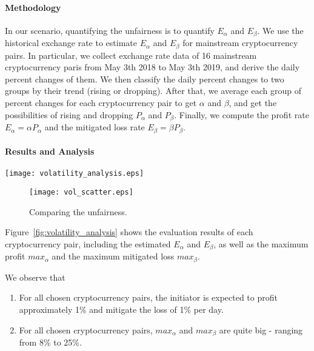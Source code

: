 \paragraph{Methodology}
In our scenario, quantifying the unfairness is to quantify $E_{\alpha}$ and $E_{\beta}$.
We use the historical exchange rate to estimate $E_{\alpha}$ and $E_{\beta}$ for mainstream cryptocurrency pairs.
In particular, we collect exchange rate data of 16 mainstream cryptocurrency paris from May 3th 2018 to May 3th 2019,
and derive the daily percent changes of them.
We then classify the daily percent changes to two groups by their trend (rising or dropping). 
After that, we average each group of percent changes for each cryptocurrency pair to get $\alpha$ and $\beta$,
and get the possibilities of rising and dropping $P_{\alpha}$ and $P_{\beta}$.
Finally, we compute the profit rate $E_{\alpha} = \alpha P_{\alpha}$ and the mitigated loss rate $E_{\beta} = \beta P_{\beta}$.

\paragraph{Results and Analysis}

\begin{figure*}
    \texttt{[image: volatility\_analysis.eps]}
    \caption{Diagram showing the unfairness.} %
    \label{fig:volatility_analysis}
\end{figure*}

\begin{figure}
    \texttt{[image: vol\_scatter.eps]}
    \caption{Comparing the unfairness.} %
    \label{fig:vol_scatter}
\end{figure}

Figure~\ref{fig:volatility_analysis} shows the evaluation results of each cryptocurrency pair, including the estimated $E_\alpha$ and $E_\beta$, as well as the maximum profit $max_\alpha$ and the maximum mitigated loss $max_\beta$.

We observe that %

\begin{enumerate}
    \item For all chosen cryptocurrency pairs, the initiator is expected to profit approximately 1\% and mitigate the loss of 1\% per day.
    \item For all chosen cryptocurrency pairs, $max_\alpha$ and $max_\beta$ are quite big - ranging from 8\% to 25\%.
\end{enumerate}


